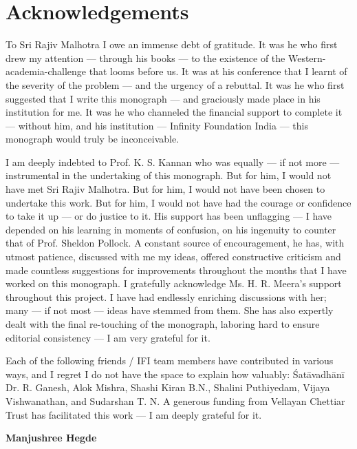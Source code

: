 \makeatletter
\def\@makeschapterhead#1{%
  \vspace*{50\p@}%
  {\parindent \z@ \raggedright
    \normalfont
    \interlinepenalty\@M
    \LARGE \bfseries  #1\par\nobreak
    \vskip 40\p@
  }}
\makeatother

\chapter*{Acknowledgements}\label{ack1}


To Sri Rajiv Malhotra I owe an immense debt of gratitude. It was he who first drew my attention --- through his books --- to the existence of the Western-academia-challenge that looms before us. It was at his conference that I learnt of the severity of the problem --- and the urgency of a rebuttal. It was he who first suggested that I write this monograph --- and graciously made place in his institution for me. It was he who channeled the financial support to complete it --- without him, and his institution --- Infinity Foundation India --- this monograph would truly be inconceivable.   

I am deeply indebted to Prof. K. S. Kannan who was equally --- if not more --- instrumental in the undertaking of this monograph. But for him, I would not have met Sri Rajiv Malhotra. But for him, I would not have been chosen to undertake this work. But for him, I would not have had the courage or confidence to take it up --- or do justice to it. His support has been unflagging --- I have depended on his learning in moments of confusion, on his ingenuity to counter that of Prof. Sheldon Pollock. A constant source of encouragement, he has, with utmost patience, discussed with me my ideas, offered constructive criticism and made countless suggestions for improvements throughout the months that I have worked on this monograph.  I gratefully acknowledge Ms. H. R. Meera’s support throughout this project. I have had endlessly enriching discussions with her; many --- if not most --- ideas have stemmed from them.  She has also expertly dealt with the final re-touching of the monograph, laboring hard to ensure editorial consistency --- I am very grateful for it. 

Each of the following friends / IFI team members have contributed in various ways, and I regret I do not have the space to explain how valuably: Śatāvadhānī Dr. R. Ganesh, Alok Mishra, Shashi Kiran B.N., Shalini Puthiyedam, Vijaya Vishwanathan, and Sudarshan T. N. A generous funding from Vellayan Chettiar Trust has facilitated this work --- I am deeply grateful for it. 


\bigskip
\hfill {\bf Manjushree Hegde}

